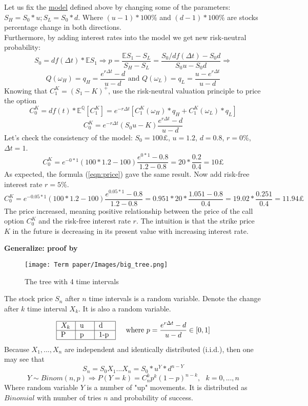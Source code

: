 \documentclass[11pt]{article}
\begin{document}
Let us fix the \hyperref[sec:sbin]{model} defined above by changing some of the parameters: $ S_H = S_0*u; S_L = S_0*d$. Where $(u - 1)*100\%$ and $(d - 1)*100\%$ are stocks percentage change in both directions.\\
Furthermore, by adding interest rates into the model we get new risk-neutral probability:
\[S_0 = df(\Delta{t})*\mathbb{E}{S_1} \Rightarrow p = \frac{\mathbb{E}{S_1} - S_L}{S_H - S_L} = \frac{S_0/df(\Delta{t})- S_0d}{S_0u - S_0d} \Rightarrow\]
\[Q(\omega_H) = q_H = \frac{e^{r\Delta{t}} - d}{u - d} \text{ and } Q(\omega_L) = q_L = \frac{u - e^{r\Delta{t}}}{u - d}\]
Knowing that $C_1^K = (S_1-K)^+$, use the risk-neutral valuation principle to price the option
\[C_0^K = df(t) * \mathbb{E^Q}{[C_1^K]} = e^{-r\Delta{t}}[{C_1^K}(\omega_H)*q_H + {C_1^K}(\omega_L)*q_L]\]
\begin{equation}
\label{eqn:price}
C_0^K = e^{-r\Delta{t}}({S_0u - K})\frac{e^{r\Delta{t}} - d}{u - d} 
\end{equation}
Let's check the consistency of the model: $S_0 = 100£$, $u = 1.2$, $ d = 0.8$, $r = 0\%$, $\Delta{t} = 1$.
\[C_0^K = e^{-0*1}({100*1.2 - 100})\frac{e^{0*1} - 0.8}{1.2 - 0.8} = 20 * \frac{0.2}{0.4} = 10£\]\label{task}
As expected, the formula (\ref{eqn:price}) gave the same result. Now add risk-free interest rate $r = 5\%$.
\[C_0^K = e^{-0.05*1}({100*1.2 - 100})\frac{e^{0.05*1} - 0.8}{1.2 - 0.8} = 0.951*20 * \frac{1.051 - 0.8}{0.4} = 19.02 * \frac{0.251}{0.4} = 11.94£\]
The price increased, meaning positive relationship between the price of the call option $C_0^K$ and the risk-free interest rate $r$. The intuition is that the strike price $K$ in the future is decreasing in its present value with increasing interest rate.


\newpage
\textbf{Generalize: proof by \cite{ICEF_A}}
\begin{figure}[H]
  \centering
  \texttt{[image: Term paper/Images/big\_tree.png]}
  \caption{The tree with 4 time intervals \protect\cite{Hull_9}}
  \label{fig:btree}
\end{figure}
The stock price $S_n$ after $n$ time intervals is a random variable. Denote the change after $k$ time interval $X_k$. It is also a random variable. 

\[\begin{tabular}{ | m{0.5cm}| m{0.5cm} | m{0.6cm} |} 
  \hline
  $X_k$ & u & d \\
  \hline
  P & p & 1-p \\ 
  \hline
\end{tabular}
\hspace{0.5cm} \text{where } p = \frac{e^{r\Delta{t}} - d}{u - d} \in [0,1]\]
Because $X_1,...,X_n$ are independent and identically distributed (i.i.d.), then one may see that 
\[S_n = S_0X_1...X_n = S_0*u^Y*d^{n-Y}\]
\[Y \sim Binom(n,p) \Rightarrow P(Y=k) = C_n^kp^k(1-p)^{n-k}, \text{ } k = 0,...,n\]
Where random variable $Y$ is a number of "up" movements. It is distributed as $Binomial$ with number of tries $n$ and probability of success.
\end{document}
